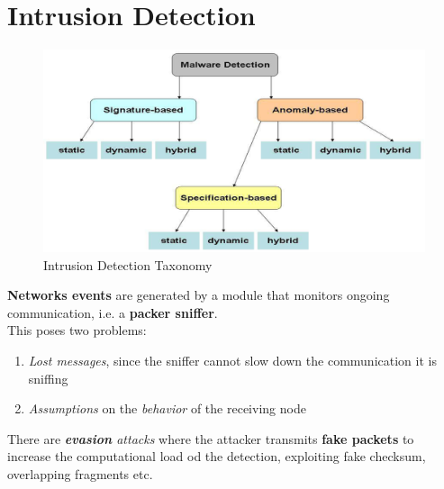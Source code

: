 \chapter{Intrusion Detection}
\begin{figure}[htbp]
   \centering
   \includegraphics{images/IntrusionDetection_schema.png}
   \caption{Intrusion Detection Taxonomy}
   \label{fig:IntrusionDetection_taxonomy}
\end{figure}

      
\textbf{Networks events} are generated by a module that monitors ongoing communication, i.e. a \textbf{packer sniffer}.\\
This poses two problems:
\begin{enumerate}
   \item \textit{Lost messages}, since the sniffer cannot slow down the communication it is sniffing
   \item \textit{Assumptions} on the \textit{behavior} of the receiving node
\end{enumerate}
There are \textit{\textbf{evasion} attacks} where the attacker transmits \textbf{fake packets} to increase the computational load od the detection,
exploiting fake checksum, overlapping fragments etc.

